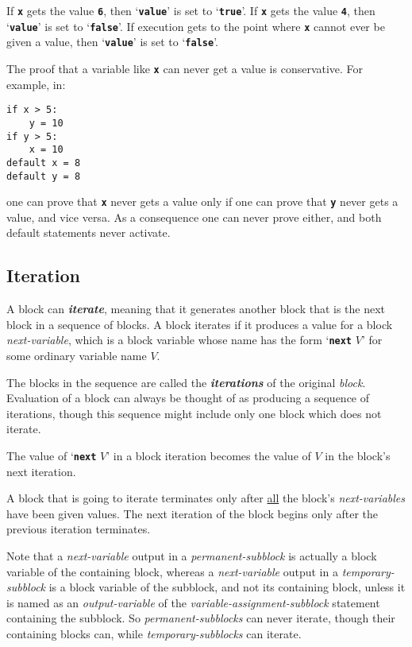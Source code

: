 \documentclass[12pt]{article}
\newcommand{\TT}[1]{{\tt \bfseries #1}}
\newcommand{\key}[1]{{\bf \em #1}\index{#1}}
\newcommand{\skey}[2]{{\bf \em #1#2}\index{#1}}
\newenvironment{indpar}[1][0.3in]%
	{\begin{list}{}%
		     {\setlength{\itemsep}{0in}%
		      \setlength{\topsep}{0in}%
		      \setlength{\parsep}{1ex}%
		      \setlength{\labelwidth}{#1}%
		      \setlength{\leftmargin}{#1}%
		      \addtolength{\leftmargin}{\labelsep}}%
	 \item}%
	{\end{list}}
\begin{document}
If \TT{x} gets the value \TT{6}, then `\TT{value}' is set to `\TT{true}'.
If \TT{x} gets the value \TT{4}, then `\TT{value}' is set to `\TT{false}'.
If execution gets to the point where \TT{x} cannot ever be given a
value, then `\TT{value}' is set to `\TT{false}'.

The proof that a variable like \TT{x} can never get a value is
conservative.  For example, in:
\begin{indpar}\begin{verbatim}
if x > 5:
    y = 10
if y > 5:
    x = 10
default x = 8
default y = 8
\end{verbatim}\end{indpar}

one can prove that \TT{x} never gets a value only if one can prove
that \TT{y} never gets a value, and vice versa.  As a consequence
one can never prove either, and both default statements never activate.

\subsection{Iteration}
\label{ITERATION}

A block can \key{iterate}, meaning that it generates another block
that is the next block in a sequence of blocks.  A block
iterates if it produces a value for a block {\em next-variable},
which is a block variable whose name has the form `\TT{next} $V$'
for some ordinary variable name $V$.

The blocks in the sequence are called the
\skey{iteration}s of the original {\em block}.
Evaluation of a block can always
be thought of as producing a sequence of iterations, though this
sequence might include only one block which does not iterate.

The value of `\TT{next} $V$' in a block iteration becomes the
value of $V$ in the block's next iteration.

A block that is going to iterate terminates only after
\underline{all} the block's {\em next-variables} have been given values.
The next iteration of the block
begins only after the previous iteration terminates.

Note that a {\em next-variable} output in a {\em permanent-subblock}
is actually a block variable of the containing block, whereas
a {\em next-variable} output in a {\em temporary-subblock} is
a block variable of the subblock, and not its containing
block, unless it is named as an
{\em output-variable} of the {\em variable-assignment-subblock}
statement containing the subblock.  So {\em permanent-subblocks}
can never iterate, though their containing blocks can,
while {\em temporary-subblocks} can iterate.
\end{document}
